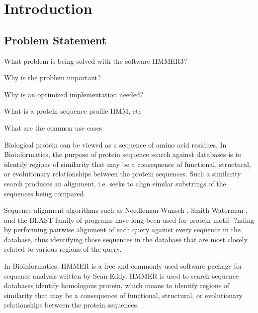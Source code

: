 
\chapter{Introduction} %



\section{Problem Statement}

What problem is being solved with the software HMMER3?

Why is the problem important?

Why is an optimized implementation needed?

What is a protein sequence profile HMM, etc

What are the common use cases

Biological protein can be viewed as a sequence of amino acid residues. In Bioinformatics, the purpose of protein sequence search against databases is to identify regions of similarity that may be a consequence of functional, structural, or evolutionary relationships between the protein sequences.
Such a similarity search produces an alignment, i.e. seeks to align similar substrings of the sequences being compared.

Sequence alignment algorithms such as Needleman-Wunsch \citep{Needleman}, Smith-Waterman \citep{SW}, and the BLAST family of programs \citep{Altschul} have long been used for protein motif-
?nding by performing pairwise alignment of each query against every sequence in
the database, thus identifying those sequences in the database that are most closely
related to various regions of the query. 


In Bioinformatics, HMMER \citep{HMMER} is a free and commonly used software package for sequence analysis written by Sean Eddy. 
HMMER is used to search sequence databases identify homologous protein, which means to identify regions of similarity that may be a consequence of functional, structural, or evolutionary relationships between the protein sequences.


